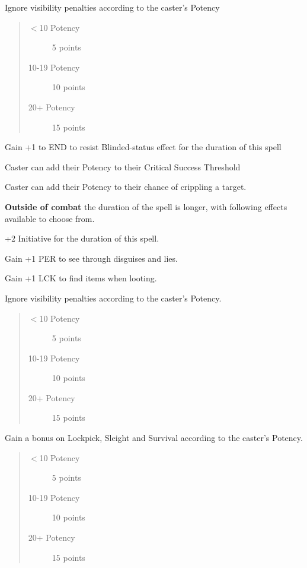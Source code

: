 \documentclass[11pt,a4paper,twocolumn]{book}
\begin{document}
\medskip

\begin{compactitem}
	\item Ignore visibility penalties according to the caster's Potency
	\begin{quote}
		\begin{description}
			\item[$<$10 Potency] 	5 points 
			\item[10-19 Potency] 	10 points
			\item[20+ Potency] 	    15 points
		\end{description}
	\end{quote}
	\item Gain +1 to END to resist Blinded-status effect for the duration of this spell
	\item Caster can add their Potency to their Critical Success Threshold
	\item Caster can add their Potency to their chance of crippling a target.
\end{compactitem}

\medskip

\textbf{Outside of combat} the duration of the spell is longer, with following effects available to choose from.

\medskip

\begin{compactitem}
	\item +2 Initiative for the duration of this spell.
	\item Gain +1 PER to see through disguises and lies.
	\item Gain +1 LCK to find items when looting.
	\item Ignore visibility penalties according to the caster's Potency.
	\begin{quote}
		\begin{description}
			\item[$<$10 Potency] 	5 points
			\item[10-19 Potency] 	10 points
			\item[20+ Potency] 	    15 points
		\end{description}
	\end{quote}
	\item Gain a bonus on Lockpick, Sleight and Survival according to the caster's Potency.	
	\begin{quote}
		\begin{description}
			\item[$<$10 Potency] 	5 points
			\item[10-19 Potency] 	10 points
			\item[20+ Potency] 	    15 points
		\end{description}
	\end{quote}
\end{compactitem}
\end{document}
